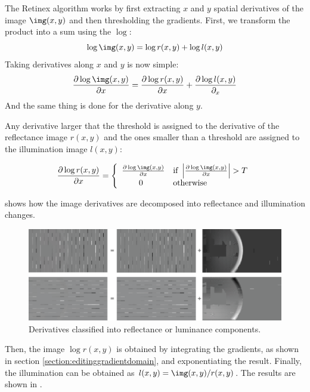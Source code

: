 The Retinex algorithm
works by first extracting $x$ and $y$ spatial derivatives of the image $\img (x,y)$ and then thresholding the gradients.  First, we transform the product into a sum using the $\log$:
\begin{equation}
	\log \img (x,y) = \log r(x,y) + \log l(x,y)
\end{equation}
Taking derivatives along $x$ and $y$ is now simple:
\begin{equation}
	\frac{\partial \log \img(x,y)}{ \partial x} = \frac{\partial \log r(x,y)}{ \partial x} + \frac{\partial \log l(x,y)}{ \partial_x}
\end{equation}
And the same thing is done for the  derivative along $y$.

Any derivative larger that the threshold is assigned to the derivative of the reflectance image $r(x,y)$ and the ones smaller than a threshold are assigned to the illumination image $l(x,y)$:

\begin{equation}
	\frac{\partial \log r(x,y)}{ \partial x} =  \left\{
	\begin{array}{rl}
		\frac{\partial \log \img (x,y)}{ \partial x} & \text{if} ~  \left| \frac{\partial \log \img (x,y)}{ \partial x} \right|>T \\
		0 ~~~~~~~~                                   & \text{otherwise}
	\end{array} \right.
\end{equation}

\Fig{\ref{fig:simultaneous2}} shows how the image derivatives are decomposed into reflectance and illumination changes.

\begin{figure}[h]
	\centerline{
		\includegraphics[width=1\linewidth]{figures/statistical_image_models/retinex_solution_b.eps}
	}
	\caption{Derivatives classified into reflectance or luminance components.}
	\label{fig:simultaneous2}
\end{figure}

Then, the image $\log r(x,y)$ is obtained by integrating the gradients, as shown in section \ref{section:editinggradientdomain}, and exponentiating the result. Finally, the illumination can be obtained as $l(x,y) = \img(x,y)/r(x,y)$. The results are shown in \fig{\ref{fig:simultaneous3}}.

